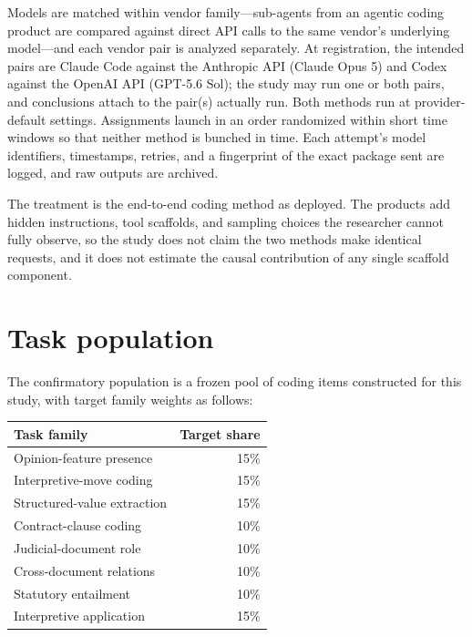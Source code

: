 \documentclass[12pt]{article}
\begin{document}
Models are matched within vendor family---sub-agents from an agentic coding product are compared against direct API calls to the same vendor's underlying model---and each vendor pair is analyzed separately. At registration, the intended pairs are Claude Code against the Anthropic API (Claude Opus 5) and Codex against the OpenAI API (GPT-5.6 Sol); the study may run one or both pairs, and conclusions attach to the pair(s) actually run. Both methods run at provider-default settings. Assignments launch in an order randomized within short time windows so that neither method is bunched in time. Each attempt's model identifiers, timestamps, retries, and a fingerprint of the exact package sent are logged, and raw outputs are archived.

The treatment is the end-to-end coding method as deployed. The products add hidden instructions, tool scaffolds, and sampling choices the researcher cannot fully observe, so the study does not claim the two methods make identical requests, and it does not estimate the causal contribution of any single scaffold component.

\section{Task population}

The confirmatory population is a frozen pool of coding items constructed for this study, with target family weights as follows:

\begin{center}
\begin{footnotesize}
\begin{tabular}{lr}
\toprule
Task family & Target share \\
\midrule
Opinion-feature presence & 15\% \\
Interpretive-move coding & 15\% \\
Structured-value extraction & 15\% \\
Contract-clause coding & 10\% \\
Judicial-document role & 10\% \\
Cross-document relations & 10\% \\
Statutory entailment & 10\% \\
Interpretive application & 15\% \\
\bottomrule
\end{tabular}
\end{footnotesize}
\end{center}
\end{document}
